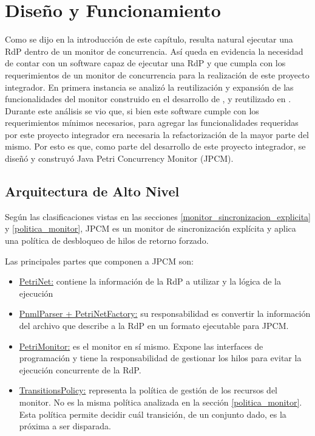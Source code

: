 \section{Diseño y Funcionamiento}

Como se dijo en la introducción de este capítulo, resulta natural ejecutar
una RdP dentro de un monitor de concurrencia. Así queda en evidencia la
necesidad de contar con un software capaz de ejecutar una RdP y que cumpla con
los requerimientos de un monitor de concurrencia para la realización de este
proyecto integrador.
En primera instancia se analizó la reutilización y expansión de las
funcionalidades del monitor construido en el desarrollo de \cite{codegen}, y
reutilizado en \cite{chimp}. Durante este análisis se vio que, si bien este
software cumple con los requerimientos mínimos necesarios, para agregar las
funcionalidades requeridas por este proyecto integrador era necesaria la
refactorización de la mayor parte del mismo.
Por esto es que, como parte del desarrollo de este proyecto integrador, se
diseñó y construyó Java Petri Concurrency Monitor (JPCM).

\subsection{Arquitectura de Alto Nivel}
\label{JPCM_arq_alto_nivel}

Según las clasificaciones vistas en las secciones
\ref{monitor_sincronizacion_explicita} y \ref{politica_monitor}, JPCM es un
monitor de sincronización explícita y aplica una política de desbloqueo de hilos
de retorno forzado.
 
Las principales partes que componen a JPCM son:
\begin{itemize}
  \item \underline{PetriNet:} contiene la información de la RdP a utilizar y la
  lógica de la ejecución
  \item \underline{PnmlParser + PetriNetFactory:} su responsabilidad es
  convertir la información del archivo que describe a la RdP en un formato
  ejecutable para JPCM.
  \item \underline{PetriMonitor:} es el monitor en sí mismo. Expone las
  interfaces de programación y tiene la responsabilidad de gestionar los hilos
  para evitar la ejecución concurrente de la RdP.
  \item \underline{TransitionsPolicy:} representa la política de gestión de los
  recursos del monitor. No es la misma política analizada en la sección
  \ref{politica_monitor}. Esta política permite decidir cuál transición, de un
  conjunto dado, es la próxima a ser disparada.
\end{itemize}


